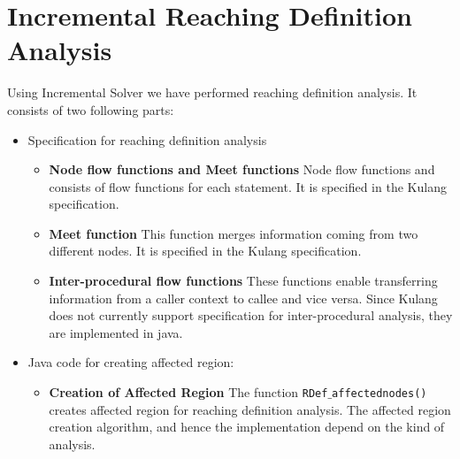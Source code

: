 \documentclass[11pt,a4paper,openright]{report}
\begin{document}
\section{Incremental Reaching Definition Analysis}
Using Incremental Solver we have performed reaching definition analysis. It consists of two following parts:
\begin{itemize}
\item Specification for reaching definition analysis
  \begin{itemize}
  \item \textbf{Node flow functions and Meet functions} Node flow functions and consists of flow functions for 
 each statement.  It is specified in the Kulang specification. 
  \item \textbf{Meet function} This function merges information coming from two different nodes. It is specified in the Kulang specification.
  \item \textbf{Inter-procedural flow functions} These functions enable transferring information from a caller context to callee and vice versa.
 Since Kulang does not currently support specification for inter-procedural analysis, they are implemented in java.
\end{itemize}
\item Java code for creating affected region:
\begin{itemize}
 \item \textbf{Creation of Affected Region} The function \texttt{RDef$\_$affectednodes()} creates affected region for reaching definition
 analysis. The affected region creation algorithm, and hence the implementation depend on the kind of analysis.
 \end{itemize}
\end{itemize}


\end{document}
